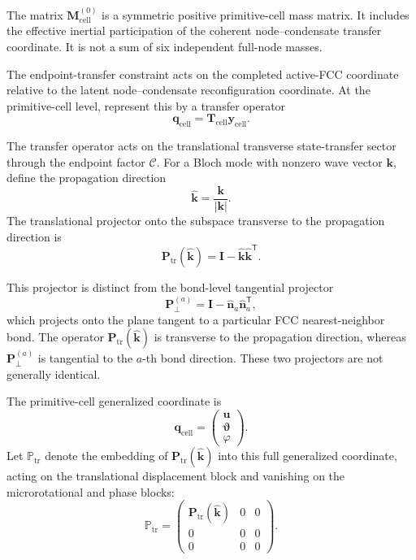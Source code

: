 The matrix $\mathbf{M}_{\mathrm{cell}}^{(0)}$ is a symmetric positive primitive-cell mass matrix. It includes the effective inertial participation of the coherent node--condensate transfer coordinate. It is not a sum of six independent full-node masses.

The endpoint-transfer constraint acts on the completed active-FCC coordinate relative to the latent node--condensate reconfiguration coordinate. At the primitive-cell level, represent this by a transfer operator
\begin{equation}
    \mathbf{q}_{\mathrm{cell}} = \mathbf{T}_{\mathrm{cell}} \mathbf{y}_{\mathrm{cell}}.
\end{equation}

The transfer operator acts on the translational transverse state-transfer sector through the endpoint factor \(\mathcal C\). For a Bloch mode with nonzero wave vector \(\mathbf k\), define the propagation direction
\begin{equation}
    \hat{\mathbf k}
    =
    \frac{\mathbf k}{|\mathbf k|}.
\end{equation}
The translational projector onto the subspace transverse to the propagation direction is
\begin{equation}
    \mathbf P_{\mathrm{tr}}(\hat{\mathbf k})
    =
    \mathbf I
    -
    \hat{\mathbf k}\hat{\mathbf k}^{\mathsf T}.
\end{equation}

This projector is distinct from the bond-level tangential projector
\begin{equation}
    \mathbf P_{\perp}^{(a)}
    =
    \mathbf I
    -
    \hat{\mathbf n}_{a}\hat{\mathbf n}_{a}^{\mathsf T},
\end{equation}
which projects onto the plane tangent to a particular FCC nearest-neighbor bond. The operator \(\mathbf P_{\mathrm{tr}}(\hat{\mathbf k})\) is transverse to the propagation direction, whereas \(\mathbf P_{\perp}^{(a)}\) is tangential to the \(a\)-th bond direction. These two projectors are not generally identical.

The primitive-cell generalized coordinate is
\begin{equation}
    \mathbf q_{\mathrm{cell}}
    =
    \begin{pmatrix}
        \mathbf u\\
        \boldsymbol\vartheta\\
        \varphi
    \end{pmatrix}.
\end{equation}
Let \(\mathbb P_{\mathrm{tr}}\) denote the embedding of \(\mathbf P_{\mathrm{tr}}(\hat{\mathbf k})\) into this full generalized coordinate, acting on the translational displacement block and vanishing on the microrotational and phase blocks:
\begin{equation}
    \mathbb P_{\mathrm{tr}}
    =
    \begin{pmatrix}
        \mathbf P_{\mathrm{tr}}(\hat{\mathbf k}) & 0 & 0\\
        0 & 0 & 0\\
        0 & 0 & 0
    \end{pmatrix}.
\end{equation}

